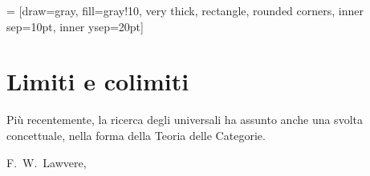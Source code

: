  = [draw=gray, fill=gray!10, very thick,
rectangle, rounded corners, inner sep=10pt, inner ysep=20pt]
\chapter{Limiti e colimiti}\label{chap_limiti_colimiti}
\epigraph{Più recentemente, la ricerca degli universali ha assunto anche una svolta concettuale, nella forma della Teoria delle Categorie.}{F.\ W.\ Lawvere, \cite{lawvere1969adjointness}}






